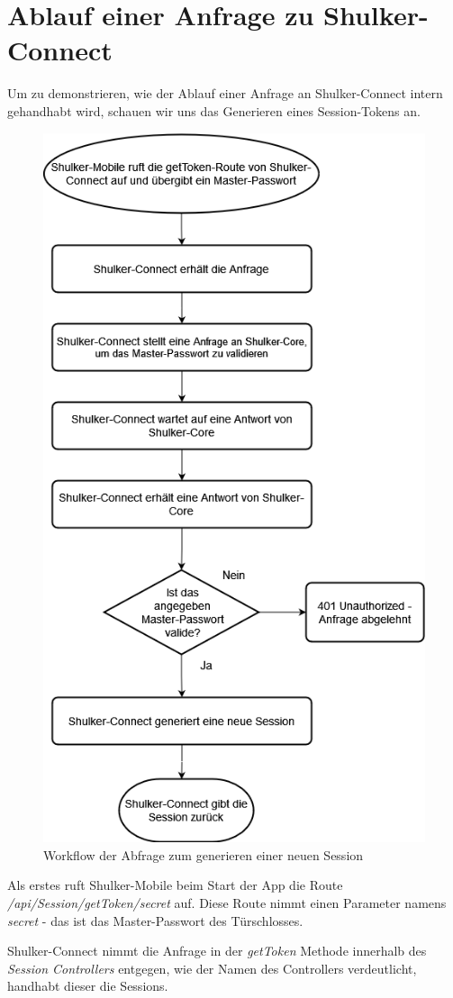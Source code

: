 \section{Ablauf einer Anfrage zu Shulker-Connect}
Um zu demonstrieren, wie der Ablauf einer Anfrage an Shulker-Connect intern gehandhabt wird, schauen wir uns das Generieren
eines Session-Tokens an.

\begin{figure}[H]
    \begin{center}
        \includegraphics[width=.6\textwidth]{images/connect/AblaufGetToken.png}
        \caption{Workflow der Abfrage zum generieren einer neuen Session}
    \end{center}
\end{figure}

Als erstes ruft Shulker-Mobile beim Start der App die Route \textit{/api/Session/getToken/{secret}} auf.
Diese Route nimmt einen Parameter namens \textit{secret} - das ist das Master-Passwort des Türschlosses.

Shulker-Connect nimmt die Anfrage in der \textit{getToken} Methode innerhalb des \textit{Session Controllers} entgegen, 
wie der Namen des Controllers verdeutlicht, handhabt dieser die Sessions.

